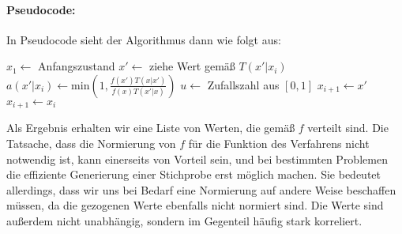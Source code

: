 	\paragraph{Pseudocode:}
	In Pseudocode sieht der Algorithmus dann wie folgt aus:
	\begin{algorithmic}
		\STATE $x_1 \leftarrow$ Anfangszustand
			\STATE $x'\leftarrow$ ziehe Wert gemäß $T(x'|x_i)$
			\STATE $a(x'|x_i) \leftarrow \text{min}\left(1, \frac{f(x')T(x|x')}{f(x)T(x'|x)}\right)$
			\STATE $u\leftarrow$ Zufallszahl aus $[0,1]$
				\STATE $x_{i+1} \leftarrow x'$
			\ELSE	\STATE $x_{i+1} \leftarrow x_i$
			\ENDIF
	  \ENDFOR
	\end{algorithmic}
	Als Ergebnis erhalten wir eine Liste von Werten, die gemäß $f$ verteilt sind.
	Die Tatsache, dass die Normierung von $f$ für die Funktion des Verfahrens nicht notwendig ist, kann einerseits von Vorteil sein, und bei bestimmten Problemen die effiziente Generierung einer Stichprobe erst möglich machen. Sie bedeutet allerdings, dass wir uns bei Bedarf eine Normierung auf andere Weise beschaffen müssen, da die gezogenen Werte ebenfalls nicht normiert sind. Die Werte sind außerdem nicht unabhängig, sondern im Gegenteil häufig stark korreliert.

